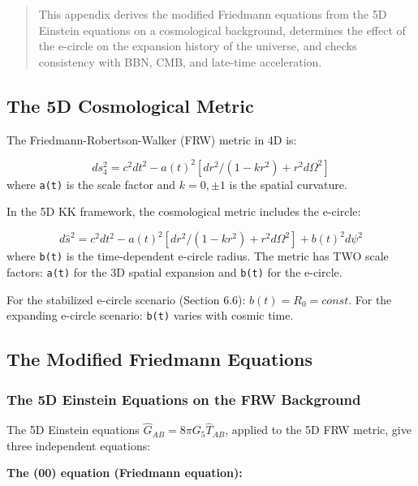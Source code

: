 \documentclass[aps,prd,preprint,superscriptaddress,longbibliography,floatfix]{revtex4-2}
\theoremstyle{remark}
\begin{document}
\begin{quote}
This appendix derives the modified Friedmann equations from the 5D Einstein
equations on a cosmological background, determines the effect of the e-circle
on the expansion history of the universe, and checks consistency with BBN,
CMB, and late-time acceleration.
\end{quote}



\subsection{The 5D Cosmological Metric}

The Friedmann-Robertson-Walker (FRW) metric in 4D is:


\begin{equation}
    ds_{4}^{2} = c^{2}dt^{2} - a(t)^{2}[dr^{2}/(1-kr^{2}) + r^{2}d\Omega^{2}]
\end{equation}
where \texttt{a(t)} is the scale factor and $k = 0, \pm1$ is the spatial curvature.

In the 5D KK framework, the cosmological metric includes the e-circle:


\begin{equation}
    d\hat{s}^{2} = c^{2}dt^{2} - a(t)^{2}[dr^{2}/(1-kr^{2}) + r^{2}d\Omega^{2}] + b(t)^{2}d\psi^{2}
\end{equation}
where \texttt{b(t)} is the time-dependent e-circle radius. The metric has TWO scale factors: \texttt{a(t)} for the 3D spatial expansion and \texttt{b(t)} for the e-circle.

For the stabilized e-circle scenario (Section 6.6): $b(t) = R_{0} = const$. For the expanding e-circle scenario: \texttt{b(t)} varies with cosmic time.



\subsection{The Modified Friedmann Equations}


\subsubsection{The 5D Einstein Equations on the FRW Background}

The 5D Einstein equations $\hat{G}_{AB} = 8\pi G_{5} \hat{T}_{AB}$, applied to the 5D FRW metric, give three independent equations:

\textbf{The (00) equation (Friedmann equation):}
\end{document}
